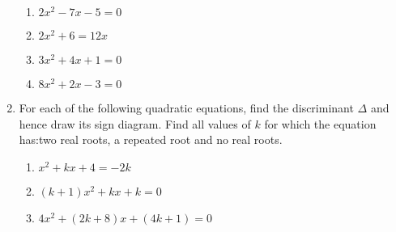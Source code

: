 \documentclass[11pt]{article}
\begin{document}
\begin{enumerate}
\begin{multicols}{3}
\begin{enumerate}
    \end{enumerate}    
\end{multicols}
\begin{multicols}{2}
    \begin{enumerate}
    \renewcommand{\labelenumii}{\arabic{enumii})}
    \item $2x^2-7x-5=0$
    \vspace{30mm}
    \item $2x^2+6=12x$
    \item $3x^2+4x+1=0$
    \vspace{30mm}
    \item $8x^2+2x-3=0$
    \end{enumerate}    
\end{multicols}
\vspace{30mm}
\item For each of the following quadratic equations, find the discriminant $\Delta$ and hence draw its sign diagram. Find all values of $k$ for which the equation has:two real roots, a repeated root and no real roots.

    \begin{enumerate}
    \renewcommand{\labelenumii}{\arabic{enumii})}
    \item $x^2+kx+4=-2k$
    \vspace{30mm}
    \item $(k+1)x^2+kx+k=0$
    \vspace{30mm}
    \item $4x^2+(2k+8)x+(4k+1)=0$
    \end{enumerate}    

\end{enumerate}
\end{document}
